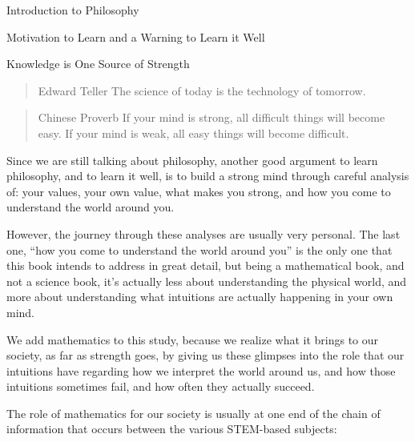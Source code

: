 \begin{chapter}{Introduction to Philosophy}
    \begin{section}{Motivation to Learn and a Warning to Learn it Well}
        \begin{subsection}{Knowledge is One Source of Strength}
            \begin{quote}{Edward Teller}
                The science of today is the technology of tomorrow.
            \end{quote}
            
            \begin{quote}{Chinese Proverb}
                If your mind is strong, all difficult things will become easy. If your mind is weak, all easy things will become difficult.
            \end{quote}
                
            Since we are still talking about philosophy, another good argument to learn philosophy, and to learn it well, is to build a strong mind through careful analysis of: your values, your own value, what makes you strong, and how you come to understand the world around you.
                
            However, the journey through these analyses are usually very personal. The last one, ``how you come to understand the world around you'' is the only one that this book intends to address in great detail, but being a mathematical book, and not a science book, it's actually less about understanding the physical world, and more about understanding what intuitions are actually happening in your own mind.
                
            We add mathematics to this study, because we realize what it brings to our society, as far as strength goes, by giving us these glimpses into the role that our intuitions have regarding how we interpret the world around us, and how those intuitions sometimes fail, and how often they actually succeed.
                
            The role of mathematics for our society is usually at one end of the chain of information that occurs between the various STEM-based subjects:
                
            \begin{figure}[ht]
                \centering
            \end{figure}
                

\end{subsection}
\end{section}
\end{chapter}
